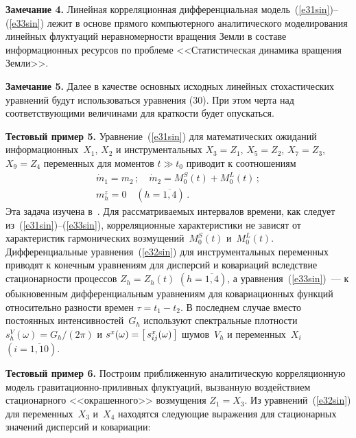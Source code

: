 \begin{multicols}{2}
\smallskip

\noindent
\textbf{Замечание 4.} Линейная корреляционная дифференциальная модель~(\ref{e31sin})--(\ref{e33sin}) лежит в основе прямого компьютерного аналитического моделирования линейных
флуктуаций неравномерности\linebreak
вращения Земли в составе информационных ресурсов по 
проб\-леме <<Статистическая динамика вращения Земли>>.
 

\smallskip

\noindent
\textbf{Замечание 5.} Далее в качестве основных исходных линейных стохастических уравнений будут использоваться уравнения (30). При
 этом черта над соответствующими величинами для краткости будет опускаться.
 

\smallskip

\noindent
\textbf{Тестовый пример 5.} Уравнение~(\ref{e31sin}) для математических ожиданий информационных~$X_1$, 
$X_2$ и инструментальных 
$X_3 = Z_1$, $X_5 = Z_2$, $X_7 = Z_3$, $X_9 = Z_4$ переменных
 для моментов $t\gg t_0$
приводит к соотношениям
\begin{gather*}
\dot m_1 = m_2\,;\quad \dot m_2 = M_0^S (t) + M_0^L (t)\,; %
\\
m_h^z =0\quad (h=\overline{1,4})\,. %
\end{gather*}
Эта задача изучена в~\cite{1sin, 3sin}.
Для рассматриваемых интервалов времени, как следует из~(\ref{e31sin})--(\ref{e33sin}), корреляционные характеристики
не зависят от характеристик гармонических возмущений~$M_0^S(t)$  и~$M_0^L(t)$.
Дифференциальные уравнения~(\ref{e32sin}) для инструментальных переменных приводят к конечным уравнениям
для дисперсий и ковариаций вследствие стационарности процессов  $Z_h = Z_h(t)$ $(h=\overline{1,4})$, а уравнения~(\ref{e33sin})~---
к обыкновенным дифференциальным уравнениям для ковариационных функций относительно разности
времен $\tau = t_1-t_2$. В последнем случае вместо постоянных интенсивностей~$G_h$ используют спектральные плотности
$s_h^V (\omega) = G_h /(2\pi)$ и $ s^x (\omega)=\left[\, s_{ij}^x (\omega)\,\right]$ шумов~$V_h$ и переменных~$X_i$ $(i=\overline{1,10})$.

\smallskip

\noindent
\textbf{Тестовый пример 6.}
 Построим приближенную аналитическую корреляционную модель гра\-ви\-та\-ци\-он\-но-при\-лив\-ных флуктуаций, вызванную воздействием
стационарного <<окрашенного>> возмущения
$Z_1 = X_3$. Из уравнений~(\ref{e32sin}) для переменных~$X_3$ и~$X_4$ находятся
следующие выражения для стационарных значений дисперсий и ковариации:


\end{multicols}

